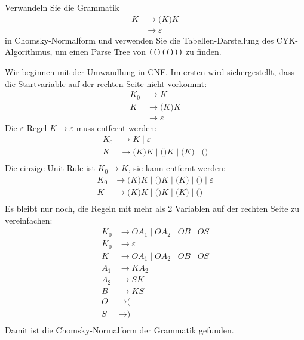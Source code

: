 Verwandeln Sie die Grammatik
\begin{align*}
K&\to \texttt{(}K\texttt{)}K \\
 &\to \varepsilon
\end{align*}
in Chomsky-Normalform und verwenden Sie die Tabellen-Darstellung
des CYK-Algorithmus, um einen Parse Tree von \texttt{(()(()))}
zu finden.


\begin{loesung}
Wir beginnen mit der Umwandlung in CNF.
Im ersten wird sichergestellt, dass die Startvariable auf der rechten
Seite nicht vorkommt:
\begin{align*}
K_0&\to K \\
K  &\to \texttt{(}K\texttt{)}K \\
   &\to \varepsilon
\end{align*}
Die $\varepsilon$-Regel $K\to\varepsilon$ muss entfernt werden:
\begin{align*}
K_0&\to K \mid  \varepsilon\\
K  &\to \texttt{(}K\texttt{)}K \mid  \texttt{()}K \mid  \texttt{(}K\texttt{)} \mid  \texttt{()}\\
\end{align*}
Die einzige Unit-Rule ist $K_0\to K$, sie kann entfernt werden:
\begin{align*}
K_0&\to \texttt{(}K\texttt{)}K \mid  \texttt{()}K \mid  \texttt{(}K\texttt{)} \mid  \texttt{()}
\mid  \varepsilon\\
K  &\to \texttt{(}K\texttt{)}K \mid  \texttt{()}K \mid  \texttt{(}K\texttt{)} \mid  \texttt{()}\\
\end{align*}
Es bleibt nur noch, die Regeln mit mehr als 2 Variablen auf der rechten
Seite zu vereinfachen:
\begin{align*}
K_0
&\to
OA_1
\mid 
OA_2
\mid 
OB
\mid 
OS
\\
K_0&\to
\varepsilon
\\
K
&\to
OA_1
\mid 
OA_2
\mid 
OB
\mid 
OS
\\
A_1&\to KA_2 \\
A_2&\to SK \\
B  &\to KS \\
O&\to \texttt{(} \\
S&\to \texttt{)} \\
\end{align*}
Damit ist die Chomsky-Normalform der Grammatik gefunden.



\end{loesung}
